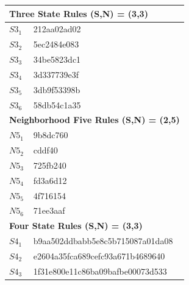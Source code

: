 \documentclass{elsarticle}
\begin{document}
\begin{multicols}{2}
\begin{table}[!htb] \centering
\small
\begin{tabular}{|p{2cm}|l|}
\hline
\multicolumn{2}{|l|}{\textbf{Three State Rules (S,N) = (3,3)}} \\ \hline
$S3_{1}$ &  212aa02ad02\\ \hline
$S3_{2}$ &  5ec2484e083\\ \hline
$S3_{3}$ &  34be5823dc1\\ \hline
$S3_{4}$ &   3d337739e3f\\ \hline
$S3_{5}$ &   3db9f53398b\\ \hline
$S3_{6}$ &   58db54c1a35\\ \hline
\multicolumn{2}{|l|}{\textbf{Neighborhood Five Rules (S,N) = (2,5)}} \\ \hline
$N5_{1}$ &   9b8dc760\\ \hline
$N5_{2}$ &    cddf40\\ \hline
$N5_{3}$ &   725fb240\\ \hline
$N5_{4}$ &   fd3a6d12\\ \hline
$N5_{5}$ &   4f716154\\ \hline
$N5_{6}$ &   71ee3aaf\\ \hline
\multicolumn{2}{|l|}{\textbf{Four State Rules (S,N) = (3,3)}} \\ \hline
$S4_{1}$ &   b9aa502ddbabb5e8c5b715087a01da08\\ \hline
$S4_{2}$ &   e2604a35fca689cefc93a671b4689640 \\ \hline
$S4_{3}$ &   1f31e800e11c86ba09bafbe00073d533\\ \hline

\end{tabular}
\end{table}
\end{multicols}
\end{document}
